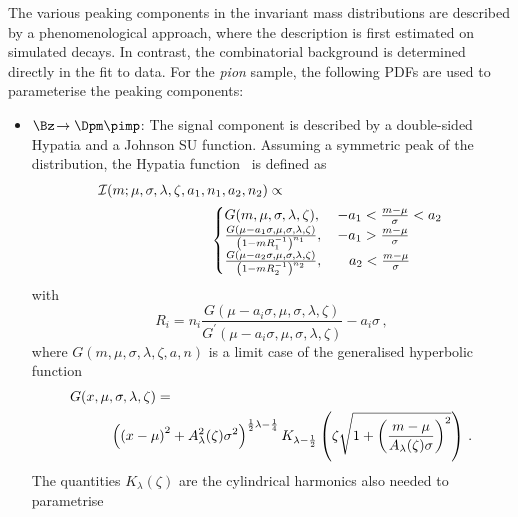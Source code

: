 The various peaking components in the invariant mass distributions are described by a phenomenological approach, where the description is first
estimated on simulated decays.
In contrast, the combinatorial background is determined directly in the fit to data.
For the \emph{pion} sample, the following PDFs are used to parameterise the peaking components:
\begin{itemize}
	\item $\Bz\!\to\Dpm\pimp$: The signal component is described by a double-sided Hypatia and a Johnson SU function.
	Assuming a symmetric peak of the distribution, the Hypatia function~\cite{Santos:2013ky} is defined as
	\begin{equation}
	\begin{aligned}
	&\mathcal{I}(m;\mu,\sigma,\lambda,\zeta,a_1,n_1,a_2,n_2) \propto\\
	&\hspace{2.8cm}\begin{cases}
	G(m,\mu,\sigma,\lambda,\zeta), &\,   - a_1 < \frac{m - \mu}{\sigma} < a_2 \\
	\frac{G(\mu - a_1\sigma,\mu,\sigma,\lambda,\zeta)}{\left(1 - mR_1^{-1}\right)^{n_1}},	&\,  - a_1 > \frac{m - \mu}{\sigma} \\
	\frac{G(\mu - a_2 \sigma,\mu,\sigma,\lambda,\zeta)}{\left(1 - mR_2^{-1}\right)^{n_2}},	&\quad a_2 < \frac{m - \mu}{\sigma} \\
	\end{cases}
	\label{eq:ipatia}
	\end{aligned}
	\end{equation}
	with
	\begin{equation}
	R_i=n_i\frac{G(\mu - a_i\sigma,\mu,\sigma,\lambda,\zeta)}{G^\prime(\mu - a_i \sigma,\mu,\sigma,\lambda,\zeta)}-a_i\sigma\,,
	\end{equation}
	where $G(m,\mu,\sigma,\lambda,\zeta,a,n)$ is a limit case of the generalised hyperbolic function
	\begin{equation}
	\begin{aligned}
	&G(x,\mu,\sigma,\lambda,\zeta)=\\
	&\hspace{1.0cm}\left(\left(x-\mu\right)^2+A_\lambda^2(\zeta)\sigma^2\right)^{\frac{1}{2}\lambda-\frac{1}{4}}K_{\lambda-\frac{1}{2}}\left(\zeta\sqrt{1+\left(\frac{m-\mu}{A_\lambda(\zeta)\sigma}\right)^2}\right)\,.
	\end{aligned}
	\end{equation}
	The quantities $K_{\lambda}(\zeta)$ are the cylindrical harmonics also needed to parametrise

\end{itemize}
